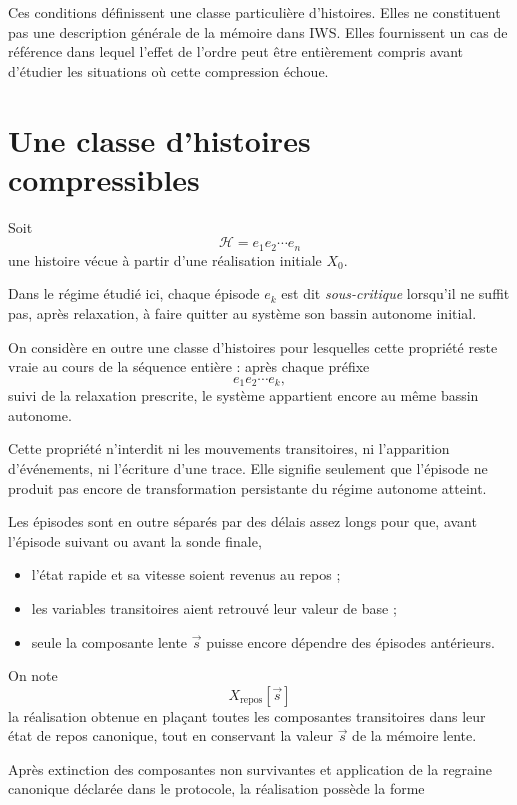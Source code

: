 Ces conditions définissent une classe particulière d'histoires. Elles ne constituent pas une description générale de la mémoire dans IWS. Elles fournissent un cas de référence dans lequel l'effet de l'ordre peut être entièrement compris avant d'étudier les situations où cette compression échoue.

\section{Une classe d'histoires compressibles}
\label{t3-classe-histoires-compressibles}

Soit
\[
\mathcal H=e_1e_2\cdots e_n
\]
une histoire vécue à partir d'une réalisation initiale $X_0$.

Dans le régime étudié ici, chaque épisode $e_k$ est dit \emph{sous-critique} lorsqu'il ne suffit pas, après relaxation, à faire quitter au système son bassin autonome initial.

On considère en outre une classe d'histoires pour lesquelles cette propriété reste vraie au cours de la séquence entière : après chaque préfixe
\[
e_1e_2\cdots e_k,
\]
suivi de la relaxation prescrite, le système appartient encore au même bassin autonome.

Cette propriété n'interdit ni les mouvements transitoires, ni l'apparition d'événements, ni l'écriture d'une trace. Elle signifie seulement que l'épisode ne produit pas encore de transformation persistante du régime autonome atteint.

Les épisodes sont en outre séparés par des délais assez longs pour que, avant l'épisode suivant ou avant la sonde finale,

\begin{itemize}
\tightlist
\item
  l'état rapide et sa vitesse soient revenus au repos ;
\item
  les variables transitoires aient retrouvé leur valeur de base ;
\item
  seule la composante lente $\vec s$ puisse encore dépendre des épisodes
  antérieurs.
\end{itemize}

On note
\[
X_{\mathrm{repos}}[\vec s]
\]
la réalisation obtenue en plaçant toutes les composantes transitoires dans leur état de repos canonique, tout en conservant la valeur $\vec s$ de la mémoire lente.

Après extinction des composantes non survivantes et application de la regraine canonique déclarée dans le protocole, la réalisation possède la forme

